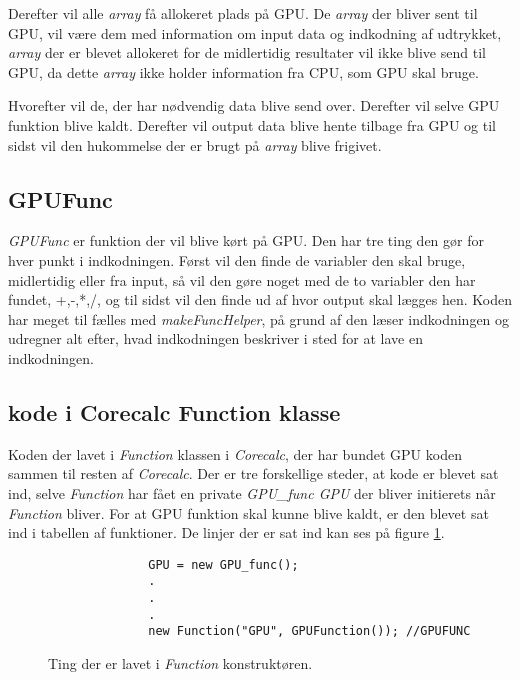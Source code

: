 Derefter vil alle \textit{array} få allokeret plads på GPU. De \textit{array} der bliver sent til GPU, vil være dem med information om input data og indkodning af udtrykket, \textit{array} der er blevet allokeret for de midlertidig resultater vil ikke blive send til GPU, da dette \textit{array} ikke holder information fra CPU, som GPU skal bruge.

Hvorefter vil de, der har nødvendig data blive send over. Derefter vil selve GPU funktion blive kaldt. Derefter vil output data blive hente tilbage fra GPU og til sidst vil den hukommelse der er brugt på \textit{array} blive frigivet.

\subsection{GPUFunc}
\textit{GPUFunc} er funktion der vil blive kørt på GPU. Den har tre ting den gør for hver punkt i indkodningen. Først vil den finde de variabler den skal bruge, midlertidig eller fra input, så vil den gøre noget med de to variabler den har fundet, +,-,*,/, og til sidst vil den finde ud af hvor output skal lægges hen. Koden har meget til fælles med \textit{makeFuncHelper}, på grund af den læser indkodningen og udregner alt efter, hvad indkodningen beskriver i sted for at lave en indkodningen.


\subsection{kode i Corecalc Function klasse}
Koden der lavet i \textit{Function} klassen i \textit{Corecalc}, der har bundet GPU koden sammen til resten af \textit{Corecalc}. Der er tre forskellige steder, at kode er blevet sat ind, selve \textit{Function} har fået en private \textit{GPU\_func GPU} der bliver initierets når \textit{Function} bliver. For at GPU funktion skal kunne blive kaldt, er den blevet sat ind i tabellen af funktioner. De linjer der er sat ind kan ses  på figure  \ref{fig:Corecalc_FC_1}.

\begin{figure}[!ht]
    \centering
    \lstset{style=sharpc}
	\begin{lstlisting}
              GPU = new GPU_func();
              .
              .
              .
              new Function("GPU", GPUFunction()); //GPUFUNC
	\end{lstlisting}
    \caption{Ting der er lavet i \textit{Function} konstruktøren.}
    \label{fig:Corecalc_FC_1}
\end{figure}


